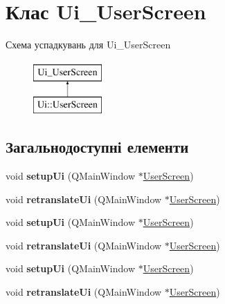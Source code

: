 \hypertarget{classUi__UserScreen}{\section{Клас Ui\-\_\-\-User\-Screen}
\label{classUi__UserScreen}
}
Схема успадкувань для Ui\-\_\-\-User\-Screen\begin{figure}[H]
\begin{center}
\leavevmode
\includegraphics[height=2.000000cm]{classUi__UserScreen}
\end{center}
\end{figure}
\subsection*{Загальнодоступні елементи}
\begin{DoxyCompactItemize}
\item 
\hypertarget{classUi__UserScreen_a54b3d739bdce488848cf19068dfe164e}{void {\bfseries setup\-Ui} (Q\-Main\-Window $\ast$\hyperlink{classUserScreen}{User\-Screen})}\label{classUi__UserScreen_a54b3d739bdce488848cf19068dfe164e}

\item 
\hypertarget{classUi__UserScreen_aeadabe075b2171763d186a2ceaf61314}{void {\bfseries retranslate\-Ui} (Q\-Main\-Window $\ast$\hyperlink{classUserScreen}{User\-Screen})}\label{classUi__UserScreen_aeadabe075b2171763d186a2ceaf61314}

\item 
\hypertarget{classUi__UserScreen_a54b3d739bdce488848cf19068dfe164e}{void {\bfseries setup\-Ui} (Q\-Main\-Window $\ast$\hyperlink{classUserScreen}{User\-Screen})}\label{classUi__UserScreen_a54b3d739bdce488848cf19068dfe164e}

\item 
\hypertarget{classUi__UserScreen_aeadabe075b2171763d186a2ceaf61314}{void {\bfseries retranslate\-Ui} (Q\-Main\-Window $\ast$\hyperlink{classUserScreen}{User\-Screen})}\label{classUi__UserScreen_aeadabe075b2171763d186a2ceaf61314}

\item 
\hypertarget{classUi__UserScreen_a54b3d739bdce488848cf19068dfe164e}{void {\bfseries setup\-Ui} (Q\-Main\-Window $\ast$\hyperlink{classUserScreen}{User\-Screen})}\label{classUi__UserScreen_a54b3d739bdce488848cf19068dfe164e}

\item 
\hypertarget{classUi__UserScreen_aeadabe075b2171763d186a2ceaf61314}{void {\bfseries retranslate\-Ui} (Q\-Main\-Window $\ast$\hyperlink{classUserScreen}{User\-Screen})}\label{classUi__UserScreen_aeadabe075b2171763d186a2ceaf61314}

\end{DoxyCompactItemize}
